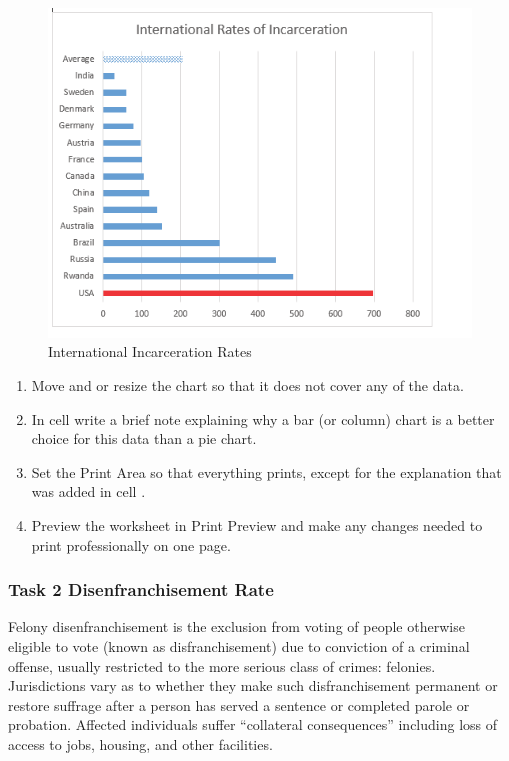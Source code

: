 \begin{figure}[H]
	\centering
	\includegraphics[width=\maxwidth{.95\linewidth}]{gfx/ch04_fig53}
	\caption{International Incarceration Rates}
	\label{04:fig53}
\end{figure}

\begin{enumerate}
	\item Move and or resize the chart so that it does not cover any of the data.
	\item In cell  write a brief note explaining why a bar (or column) chart is a better choice for this data than a pie chart.
	\item Set the Print Area so that everything prints, except for the explanation that was added in cell .
	\item Preview the  worksheet in Print Preview and make any changes needed to print professionally on one page.
\end{enumerate}

\subsubsection{Task 2 Disenfranchisement Rate}

Felony disenfranchisement is the exclusion from voting of people otherwise eligible to vote (known as disfranchisement) due to conviction of a criminal offense, usually restricted to the more serious class of crimes: felonies. Jurisdictions vary as to whether they make such disfranchisement permanent or restore suffrage after a person has served a sentence or completed parole or probation. Affected individuals suffer ``collateral consequences'' including loss of access to jobs, housing, and other facilities.

